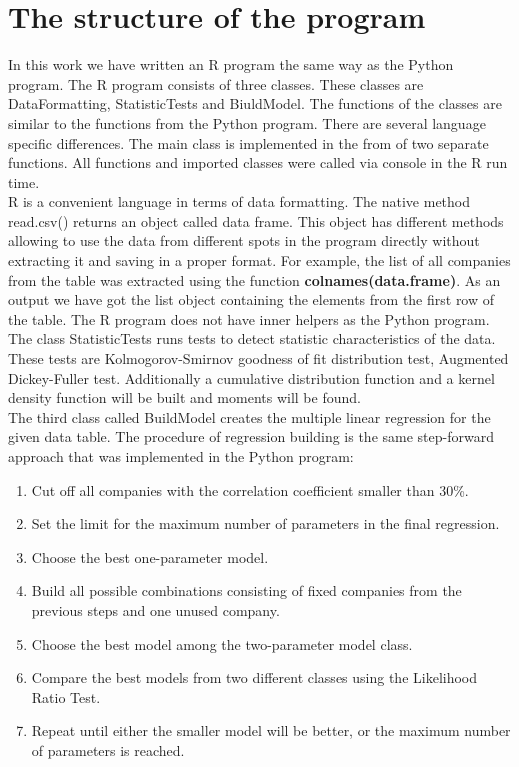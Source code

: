 \documentclass[
  twoside,
  11pt, a4paper,
  footinclude=true,
  headinclude=true,
  cleardoublepage=empty
]{scrreprt}
\begin{document}
    \section{The structure of the program}
    In this work we have written an R program the same way as the Python program. The R program consists of three classes. These classes are DataFormatting, StatisticTests and BiuldModel. The functions of the classes are similar to the functions from the Python program. There are several language specific differences. The main class is implemented in the from of two separate functions. All functions and imported classes were called via console in the R run time.\\
    R is a convenient language in terms of data formatting. The native method read.csv() returns an object called data frame. This object has different methods allowing to use the data from different spots in the program directly without extracting it and saving in a proper format. For example, the list of all companies from the table was extracted using the function \textbf{colnames(data.frame)}. As an output we have got the list object containing the elements from the first row of the table. The R program does not have inner helpers as the Python program.\\
    The class StatisticTests runs tests to detect statistic characteristics of the data. These tests are Kolmogorov-Smirnov goodness of fit distribution test, Augmented Dickey-Fuller test. Additionally a cumulative distribution function and a kernel density function will be built and moments will be found.\\
    The third class called BuildModel creates the multiple linear regression for the given data table. The procedure of regression building is the same step-forward approach that was implemented in the Python program:
    \begin{enumerate}
        \item Cut off all companies with the correlation coefficient smaller than 30\%.
        \item Set the limit for the maximum number of parameters in the final regression. 
        \item Choose the best one-parameter model.
        \item Build all possible combinations consisting of fixed companies from the previous steps and one unused company.
        \item Choose the best model among the two-parameter model class.
        \item Compare the best models from two different classes using the Likelihood Ratio Test.
        \item Repeat until either the smaller model will be better, or the maximum number of parameters is reached.
    \end{enumerate}
    
\end{document}
